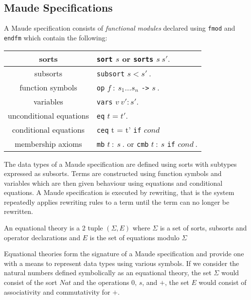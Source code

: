 \subsection{Maude Specifications}

A Maude specification consists of \emph{functional modules} declared using \texttt{fmod} and \texttt{endfm} which contain the following:

\medskip
\begin{center}
\begin{tabular}{| c | l |}
\hline
sorts    & \texttt{sort} $s$ or \texttt{sorts}  $s \ s' .$ \\ \hline
subsorts  & \texttt{subsort} $s < s' \ .$ \\ \hline
function symbols  & \texttt{op} $f \ :  \ s_1 \ldots s_n$ \texttt{->} $s \ .$ \\ \hline
variables  & \texttt{vars} $v \ v' : s' .$\\ \hline
unconditional equations  &\texttt{eq} $t = t' .$\\ \hline
conditional equations & \texttt{ceq} t = t' \texttt{if} $cond$ \\ \hline
membership axioms & \texttt{mb} $t \ : \ s \ .$ or \texttt{cmb} $t  \ : \ s$ \texttt{if} $cond \ .$  \\ \hline
\end{tabular}
\end{center}
\medskip
The data types of a Maude specification are defined using sorts with subtypes expressed as subsorts. Terms are constructed using function symbols and variables which are then  given behaviour using equations and conditional equations.  A Maude specification is executed by rewriting, that is the system repeatedly applies rewriting rules to a term until the term can no longer be rewritten.

\medskip
\begin{mydef}
An equational theory is a 2 tuple $(\Sigma, E)$ where $\Sigma$ is a set of sorts, subsorts and operator declarations  and $E$ is the set of equations modulo $\Sigma$
\end{mydef}

Equational theories \cite{JM98} form the signature of a Maude specification and provide one with a means to represent data types using various symbols. If we consider the natural numbers defined symbolically  as an equational theory, the set $\Sigma$ would consist of the sort $Nat$ and the operations $0$, $s$, and $+$, the set $E$ would consist of associativity and commutativity for $+$.

